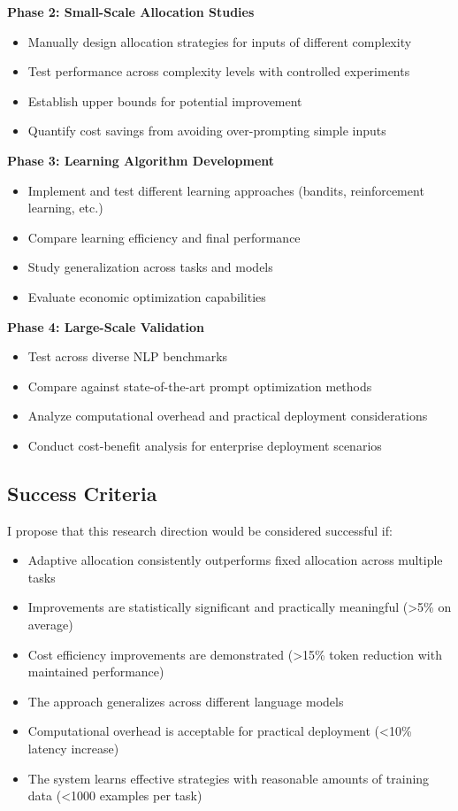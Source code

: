 \documentclass[11pt,a4paper]{article}
\begin{document}
\textbf{Phase 2: Small-Scale Allocation Studies}
\begin{itemize}
\item Manually design allocation strategies for inputs of different complexity
\item Test performance across complexity levels with controlled experiments
\item Establish upper bounds for potential improvement
\item Quantify cost savings from avoiding over-prompting simple inputs
\end{itemize}

\textbf{Phase 3: Learning Algorithm Development}
\begin{itemize}
\item Implement and test different learning approaches (bandits, reinforcement learning, etc.)
\item Compare learning efficiency and final performance
\item Study generalization across tasks and models
\item Evaluate economic optimization capabilities
\end{itemize}

\textbf{Phase 4: Large-Scale Validation}
\begin{itemize}
\item Test across diverse NLP benchmarks
\item Compare against state-of-the-art prompt optimization methods
\item Analyze computational overhead and practical deployment considerations
\item Conduct cost-benefit analysis for enterprise deployment scenarios
\end{itemize}

\subsection{Success Criteria}

I propose that this research direction would be considered successful if:

\begin{itemize}
\item Adaptive allocation consistently outperforms fixed allocation across multiple tasks
\item Improvements are statistically significant and practically meaningful (>5\% on average)
\item Cost efficiency improvements are demonstrated (>15\% token reduction with maintained performance)
\item The approach generalizes across different language models
\item Computational overhead is acceptable for practical deployment (<10\% latency increase)
\item The system learns effective strategies with reasonable amounts of training data (<1000 examples per task)
\end{itemize}
\end{document}
